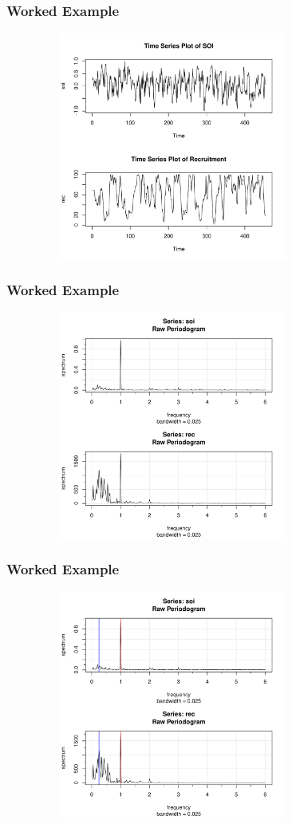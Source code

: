 \documentclass[%
xcolor=pdftex]{beamer}
\begin{document}
\begin{frame}
\frametitle{Worked Example}

\includegraphics[width=110mm, height=75mm]{ts.pdf}

\end{frame}

\begin{frame}
\frametitle{Worked Example}

\includegraphics[width=110mm, height=75mm]{periodogram.pdf}

\end{frame}

\begin{frame}
\frametitle{Worked Example}

\includegraphics[width=110mm, height=75mm]{periodogram2.pdf}

\end{frame}
\end{document}
